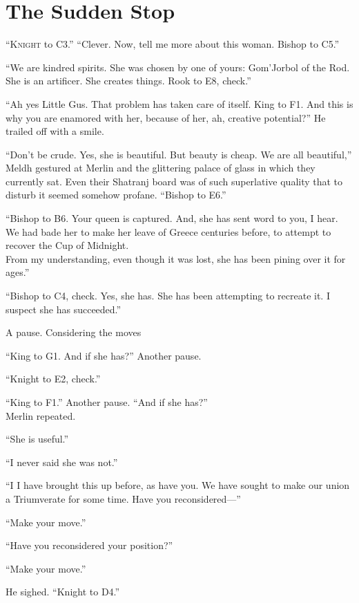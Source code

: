 \chapter{The Sudden Stop}

\lettrine{“K}{night} to C3.”
“Clever. Now, tell me more about this woman. Bishop to C5.”

“We are kindred spirits. She was chosen by one of yours: Gom’Jorbol of the Rod. She is an artificer. She{\el} creates things. Rook to E8, check.”

“Ah yes{\el} Little Gus. That problem has taken care of itself. King to F1. And this is why you are enamored with her, because of her, ah, creative potential?” He trailed off with a smile.

“Don’t be crude. Yes, she is beautiful. But beauty is cheap. We are all beautiful,” Meldh gestured at Merlin and the glittering palace of glass in which they currently sat. Even their Shatranj board was of such superlative quality that to disturb it seemed somehow profane. “Bishop to E6.”

“Bishop to B6. Your queen is captured. And, she has sent word to you, I hear. We had bade her to make her leave of Greece centuries before, to attempt to recover the Cup of Midnight.\\From my understanding, even though it was lost, she has been pining over it for ages.”

“Bishop to C4, check. Yes, she has. She has been attempting to recreate it. I suspect she has succeeded.”

A pause. Considering the moves{\el}

“King to G1. And if she has?”
Another pause.

“Knight to E2, check.”

“King to F1.” Another pause. “And if she has?”\\Merlin repeated.

“She is useful.”

“I never said she was not.”

“I{\el} I have brought this up before, as have you. We have sought to make our union a Triumverate for some time. Have you reconsidered\mbox{---}”

“Make your move.”

“Have you reconsidered your position?”

“Make your move.”

He sighed. “Knight to D4.”


